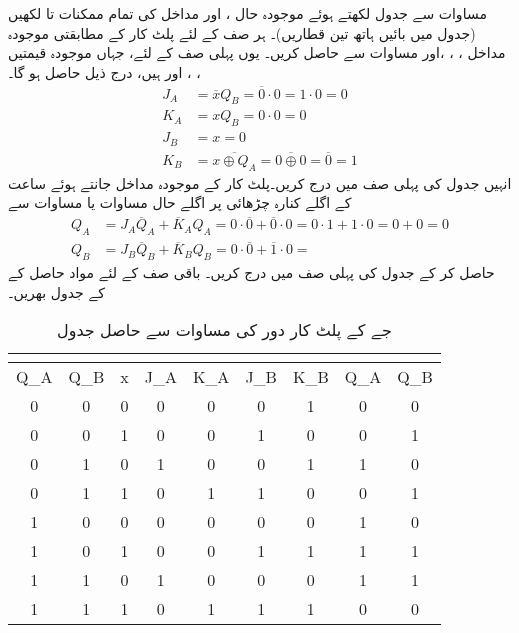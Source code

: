 مساوات  سے جدول  لکھتے ہوئے موجودہ حال ،  اور مداخل  کی تمام ممکنات  تا  لکھیں (جدول میں بائیں ہاتھ تین قطاریں)۔ ہر صف کے لئے پلٹ کار کے مطابقتی موجودہ مداخل ، ، ،اور  مساوات  سے حاصل کریں۔ یوں پہلی صف کے لئے، جہاں موجودہ قیمتیں ، ، اور  ہیں، درج ذیل حاصل ہو گا۔
\begin{align*}
J_A&=\overline{x}Q_B=\overline{0}\cdot 0=1\cdot 0=0\\
K_A&=xQ_B=0\cdot 0=0\\
J_B&=x=0\\
K_B&=\overline{x\oplus Q_A}=\overline{0\oplus 0}=\overline{0}=1
\end{align*}
انہیں جدول کی پہلی صف میں درج کریں۔پلٹ کار کے موجودہ مداخل جانتے ہوئے ساعت کے اگلے کنارہ چڑھائی پر اگلے حال مساوات   یا مساوات  سے 
\begin{align*}
Q_A&=J_A\overline{Q}_A+\overline{K}_AQ_A=0\cdot \overline{0}+\overline{0}\cdot 0=0\cdot 1+1\cdot 0=0+0=0\\
Q_B&=J_B\overline{Q}_B+\overline{K}_BQ_B=0\cdot \overline{0}+\overline{1}\cdot 0= 
\end{align*}
 حاصل کر کے جدول کی پہلی صف میں درج کریں۔ باقی صف کے لئے مواد حاصل کے کے جدول بھریں۔
 
\begin{table}
\caption{جے کے پلٹ کار دور کی مساوات  سے حاصل جدول}
\label{جدول_ترتیبی_جے_کے_بطور_مثال}
\centering
\begin{otherlanguage}{english}
\begin{tabular}{CCC|CCCC|CC}
\toprule
{} &&\\
\midrule
Q_A&Q_B&x&J_A&K_A&J_B&K_B&Q_A&Q_B\\
&0&0&0&0&0&1&0&0\\
0&0&1&0&0&1&0&0&1\\
&1&0&1&0&0&1&1&0\\
0&1&1&0&1&1&0&0&1\\
&0&0&0&0&0&0&1&0\\
1&0&1&0&0&1&1&1&1\\
&1&0&1&0&0&0&1&1\\
1&1&1&0&1&1&1&0&0\\
\bottomrule
\end{tabular}
\end{otherlanguage}
\end{table}

